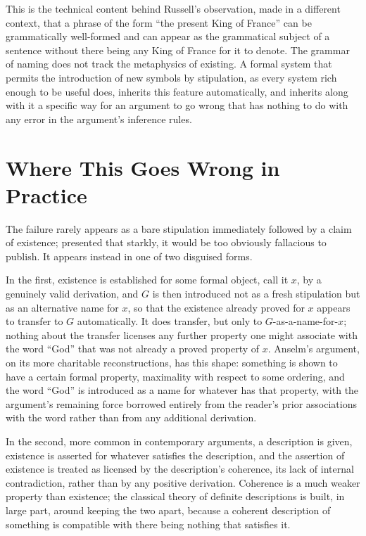 \documentclass[11pt]{book}
\begin{document}
This is the technical content behind Russell's observation, made in a different context, that a phrase of the form ``the present King of France'' can be grammatically well-formed and can appear as the grammatical subject of a sentence without there being any King of France for it to denote. The grammar of naming does not track the metaphysics of existing. A formal system that permits the introduction of new symbols by stipulation, as every system rich enough to be useful does, inherits this feature automatically, and inherits along with it a specific way for an argument to go wrong that has nothing to do with any error in the argument's inference rules.

\section{Where This Goes Wrong in Practice}

The failure rarely appears as a bare stipulation immediately followed by a claim of existence; presented that starkly, it would be too obviously fallacious to publish. It appears instead in one of two disguised forms.

In the first, existence is established for some formal object, call it $x$, by a genuinely valid derivation, and $G$ is then introduced not as a fresh stipulation but as an alternative name for $x$, so that the existence already proved for $x$ appears to transfer to $G$ automatically. It does transfer, but only to $G$-as-a-name-for-$x$; nothing about the transfer licenses any further property one might associate with the word ``God'' that was not already a proved property of $x$. Anselm's argument, on its more charitable reconstructions, has this shape: something is shown to have a certain formal property, maximality with respect to some ordering, and the word ``God'' is introduced as a name for whatever has that property, with the argument's remaining force borrowed entirely from the reader's prior associations with the word rather than from any additional derivation.

In the second, more common in contemporary arguments, a description is given, existence is asserted for whatever satisfies the description, and the assertion of existence is treated as licensed by the description's coherence, its lack of internal contradiction, rather than by any positive derivation. Coherence is a much weaker property than existence; the classical theory of definite descriptions is built, in large part, around keeping the two apart, because a coherent description of something is compatible with there being nothing that satisfies it.
\end{document}
